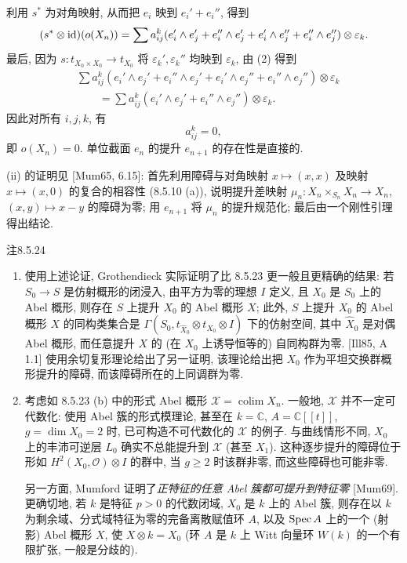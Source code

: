 利用 $s^*$ 为对角映射, 从而把 $e_i$ 映到 $e_i'+e_i''$, 得到
\[(s^*\otimes\mathrm{id})(o(X_n))=\sum a_{ij}^k(e_i'\wedge e_j'+e_i''\wedge e_j'+e_i'\wedge e_j''+e_i''\wedge e_j'')\otimes \varepsilon_k.\]
最后, 因为 $s:t_{X_0\times X_0}\to t_{X_0}$ 将 $\varepsilon_k',\varepsilon_k''$ 均映到 $\varepsilon_k$, 由 (2) 得到
\[\begin{aligned}
&\sum a_{ij}^k(e_i'\wedge e_j'+e_i''\wedge e_j'+e_i'\wedge e_j''+e_i''\wedge e_j'')\otimes \varepsilon_k\\
&\hspace{2em}=\sum a_{ij}^k(e_i'\wedge e_j'+e_i''\wedge e_j'')\otimes \varepsilon_k.
\end{aligned}\]
因此对所有 $i,j,k$, 有
\[a_{ij}^k=0,\]
即 $o(X_n)=0$. 单位截面 $e_n$ 的提升 $e_{n+1}$ 的存在性是直接的.

(ii) 的证明见 [Mum65, 6.15]: 首先利用障碍与对角映射 $x\mapsto(x,x)$ 及映射 $x\mapsto(x,0)$ 的复合的相容性 (8.5.10 (a)), 说明提升差映射 $\mu_n:X_n\times_{S_n}X_n\to X_n$, $(x,y)\mapsto x-y$ 的障碍为零; 用 $e_{n+1}$ 将 $\mu_n$ 的提升规范化; 最后由一个刚性引理得出结论.

\begin{origstatement}{注}{8.5.24}\label{ch08:rem8524}
\begin{enumerate}
\item[(a)] 使用上述论证, Grothendieck 实际证明了比 8.5.23 更一般且更精确的结果: 若 $S_0\to S$ 是仿射概形的闭浸入, 由平方为零的理想 $I$ 定义, 且 $X_0$ 是 $S_0$ 上的 Abel 概形, 则存在 $S$ 上提升 $X_0$ 的 Abel 概形 $X$; 此外, $S$ 上提升 $X_0$ 的 Abel 概形 $X$ 的同构类集合是 $\Gamma(S_0,t_{\widehat X_0}\otimes t_{X_0}\otimes I)$ 下的仿射空间, 其中 $\widehat X_0$ 是对偶 Abel 概形, 而任意提升 $X$ 的 (在 $X_0$ 上诱导恒等的) 自同构群为零. [Ill85, A 1.1] 使用余切复形理论给出了另一证明, 该理论给出把 $X_0$ 作为平坦交换群概形提升的障碍, 而该障碍所在的上同调群为零.
\item[(b)] 考虑如 8.5.23 (b) 中的形式 Abel 概形 $\mathcal X=\operatorname{colim}X_n$. 一般地, $\mathcal X$ 并不一定可代数化: 使用 Abel 簇的形式模理论, 甚至在 $k=\mathbb C$, $A=\mathbb C[[t]]$, $g=\dim X_0=2$ 时, 已可构造不可代数化的 $\mathcal X$ 的例子. 与曲线情形不同, $X_0$ 上的丰沛可逆层 $L_0$ 确实不总能提升到 $\mathcal X$ (甚至 $X_1$). 这种逐步提升的障碍位于形如 $H^2(X_0,\mathcal O)\otimes I$ 的群中, 当 $g\geq2$ 时该群非零, 而这些障碍也可能非零.

另一方面, Mumford 证明了\emph{正特征的任意 Abel 簇都可提升到特征零} [Mum69]. 更确切地, 若 $k$ 是特征 $p>0$ 的代数闭域, $X_0$ 是 $k$ 上的 Abel 簇, 则存在以 $k$ 为剩余域、分式域特征为零的完备离散赋值环 $A$, 以及 $\operatorname{Spec} A$ 上的一个 (射影) Abel 概形 $X$, 使 $X\otimes k=X_0$ (环 $A$ 是 $k$ 上 Witt 向量环 $W(k)$ 的一个有限扩张, 一般是分歧的).
\end{enumerate}
\end{origstatement}

